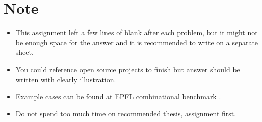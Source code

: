 \documentclass[main.tex]{subfiles}
\begin{document}
\thispagestyle{empty}
\section*{Note}
\begin{itemize}
    \item This assignment left a few lines of blank after each problem, but it might not be enough space for the answer and it is recommended to write on a separate sheet.
    \item You could reference open source projects to finish but answer should be written with clearly illustration.
    \item Example cases can be found at EPFL combinational benchmark \cite{EPFLCombBenchmark}.
    \item Do not spend too much time on recommended thesis, assignment first.
\end{itemize}
\end{document}
